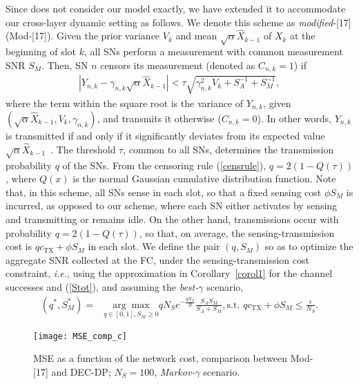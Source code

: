 \documentclass[10pt,twocolumn,twoside]{IEEEtran}
\theoremstyle{plain}
\begin{document}
Since \cite{Msechu} does not consider our model exactly, we have extended it to accommodate our cross-layer dynamic setting as follows.
We denote this scheme as \emph{modified}-[17] (Mod-[17]).
Given the prior variance $V_k$ and mean $\sqrt{\alpha}\hat X_{k-1}$ of $X_k$ at the beginning of slot $k$, 
all SNs perform a measurement with common measurement SNR $S_M$. Then,
SN $n$ censors its measurement (denoted as $C_{n,k}{=}1$) if 
\begin{align}
\label{censrule}
\left|Y_{n,k}-\gamma_{n,k}\sqrt{\alpha}\hat X_{k-1}\right|<\tau\sqrt{\gamma_{n,k}^2V_k+S_A^{-1}+S_M^{-1}},
\end{align}
where the term within the square root is the variance of $Y_{n,k}$, given $(\sqrt{\alpha}\hat X_{k-1},V_k,\gamma_{n,k})$,
and transmits it otherwise ($C_{n,k}=0$).
In other words, $Y_{n,k}$ is transmitted if and only if it significantly deviates from its expected value $\sqrt{\alpha}\hat X_{k-1}$~\cite{Msechu}.
The threshold $\tau$, common to all SNs, determines the transmission probability $q$ of the SNs. From the censoring rule
(\ref{censrule}), $q=2(1-Q(\tau))$,
where $Q(x)$ is the normal Gaussian cumulative distribution function.
Note that, in this scheme, all SNs sense in each slot, so that a fixed sensing cost $\phi S_M$ is incurred, as opposed to our scheme,
where each SN either activates by sensing and transmitting or remains idle. On the other hand, transmissions occur with probability 
$q=2(1-Q(\tau))$, so that, on average, the sensing-transmission cost is $qc_{\mathrm{TX}}+\phi S_M$ in each slot.
We define the pair $(q,S_M)$ so as to optimize the aggregate SNR collected at the FC, under the sensing-transmission cost constraint,
\emph{i.e.}, using the approximation in Corollary~\ref{corol1} for the channel successes
and (\ref{Stot}), and assuming the \emph{best-}$\gamma$  scenario, 
\begin{align*}
(q^*\!\!,\!S_M^*)\!=\!\!\!\!&\underset{q\in[0,1],S_M\geq 0}{\arg\max}\!\!\!\!qN_Se^{-\frac{qN_S}{B}}\!\!\frac{S_AS_M}{S_A\!+\!S_M},
\text{s.t. }qc_{\mathrm{TX}}\!+\!\phi S_M\!\!\leq\!\!\frac{\epsilon}{N_S}\!.
\end{align*}
\begin{figure}[t]
\centering
\texttt{[image: MSE\_comp\_c]}
\vspace{-3mm}
\caption{MSE as a function of the network cost, comparison between Mod-[17] and DEC-DP;
$N_S=100$, \emph{Markov-}$\gamma$ scenario.}\label{MSE_comp}
\vspace{-5mm}
\end{figure}
\end{document}
